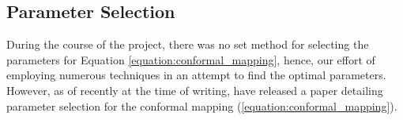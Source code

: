 \documentclass[a4paper]{report}
\begin{document}
\subsection{Parameter Selection}
During the course of the project, there was no set method for selecting the parameters for Equation \ref{equation:conformal_mapping}, hence, our effort of employing numerous techniques in an attempt to find the optimal parameters. However, as of recently at the time of writing, \citet{boyarchenko2024efficient} have released a paper detailing parameter selection for the conformal mapping (\ref{equation:conformal_mapping}).





\end{document}
